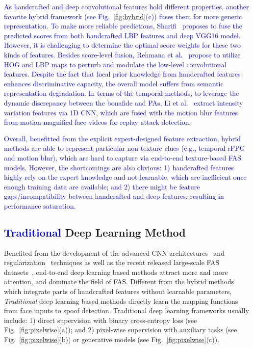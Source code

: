 \documentclass[10pt,journal,compsoc]{IEEEtran}
\begin{document}
\textcolor{blue}{As handcrafted and deep convolutional features hold different properties, another favorite hybrid framework (see Fig.~\ref{fig:hybrid}(c)) fuses them for more generic representation. To make more reliable predictions, Sharifi~\cite{sharifi2019score} proposes to fuse the predicted scores from both handcrafted LBP features and deep VGG16 model. However, it is challenging to determine the optimal score weights for these two kinds of features. Besides score-level fusion, Rehmana et al.~\cite{rehman2019perturbing,rehman2020enhancing} propose to utilize HOG and LBP maps to perturb and modulate the low-level convolutional features. Despite the fact that local prior knowledge from handcrafted features enhances discriminative capacity, the overall model suffers from semantic representation degradation. In terms of the temporal methods, to leverage the dynamic discrepancy between the bonafide and PAs, Li et al.~\cite{li2019replayed} extract intensity variation features via 1D CNN, which are fused with the motion blur features from motion magnified face videos for replay attack detection.}  


\textcolor{blue}{Overall, benefitted from the explicit expert-designed feature extraction, hybrid methods are able to represent particular non-texture clues (e.g., temporal rPPG and motion blur), which are hard to capture via end-to-end texture-based FAS models. However, the shortcomings are also obvious: 1) handcrafted features highly rely on the expert knowledge and not learnable, which are inefficient once enough training data are available; and 2) there might be feature gaps/incompatibility between handcrafted and deep features, resulting in performance saturation. }



\subsection{\textcolor{blue}{Traditional} Deep Learning Method}
Benefited from the development of the advanced CNN architectures~\cite{huang2017densely,ronneberger2015u} and regularization~\cite{ioffe2015batch,srivastava2014dropout} techniques as well as the recent released large-scale FAS datasets~\cite{Boulkenafet2017OULU,zhang2020celeba,liu2021contrastive}, end-to-end deep learning based methods attract more and more attention, and dominate the field of FAS. Different from the hybrid methods which integrate parts of handcrafted features without learnable parameters, \textit{Traditional} deep learning based methods directly learn the mapping functions from face inputs to spoof detection. Traditional deep learning frameworks usually include: 1) direct supervision with binary cross-entropy loss (see Fig.~\ref{fig:pixelwise}(a)); and 2) pixel-wise supervision with auxiliary tasks (see Fig.~\ref{fig:pixelwise}(b)) or generative models (see Fig.~\ref{fig:pixelwise}(c)).    
\end{document}
